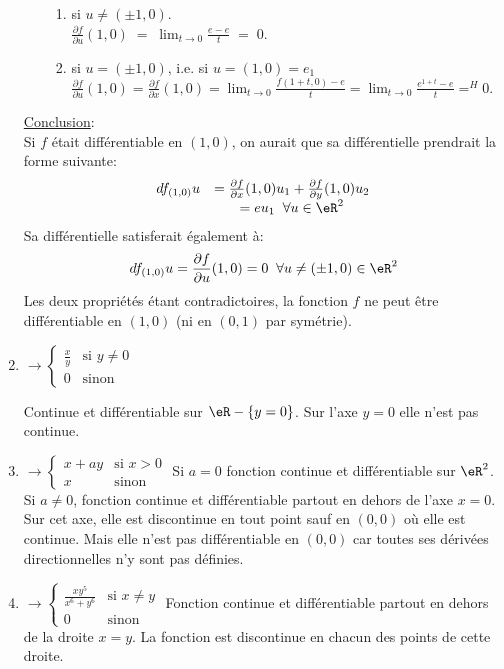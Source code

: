 \begin{enumerate}
\begin{enumerate}
\begin{enumerate}
\item si $u\neq(\pm1,0)$.\\
    $\frac{ \partial f }{ \partial u }(1,0) \;=\;\lim_{t\rightarrow 0}\frac{e-e}{t}\;=\;0$.
\item si $u=(\pm1,0)$, i.e. si $u=(1,0) = e_1$\\
    $\frac{ \partial f }{ \partial u }(1,0) = \frac{ \partial f }{ \partial x }(1,0)=\lim_{t\rightarrow 0}\frac{f(1+t,0)-e}{t}=\lim_{t\rightarrow 0}\frac{e^{1+t}-e}{t} =^H0$.
\end{enumerate}
\end{enumerate}
\underline{Conclusion}:\\
Si $f$ était différentiable en $(1,0)$, on aurait que sa différentielle prendrait la forme suivante:
\[\begin{array}{cc} df_{(1,0)}u& = \frac{ \partial f }{ \partial x }(1,0)u_1+\frac{ \partial f }{ \partial y }(1,0)u_2\\
    & = eu_1\;\;\forall u\in\eR^2 \end{array} \]
Sa différentielle satisferait également à:
\[  df_{(1,0)}u = \frac{ \partial f }{ \partial u }(1,0) = 0 \;\; \forall u \neq (\pm1,0) \in \eR^2\]
Les deux propriétés étant contradictoires, la fonction $f$ ne peut être différentiable en $(1,0)$ (ni en $(0,1)$ par symétrie).

\item \( \rightarrow  \begin{cases}
        \frac{ x }{ y }    &   \text{si } y\neq 0\\
        0    &    \text{sinon}
    \end{cases}\)

Continue et différentiable sur $\eR-\{y=0\}$. Sur l'axe $y=0$ elle n'est pas continue.
\item \( \rightarrow  \begin{cases}
        x+ay    &   \text{si } x>0\\
        x    &    \text{sinon}
    \end{cases}\)
Si $a=0$ fonction continue et différentiable sur $\eR^2$. Si $a\neq0$, fonction continue et différentiable partout en dehors de l'axe $x=0$. Sur cet axe, elle est discontinue en tout point sauf en $(0,0)$ où elle est continue. Mais elle n'est pas différentiable en $(0,0)$ car toutes ses dérivées directionnelles  n'y sont pas définies.
\item \(  \rightarrow\begin{cases}
        \frac{ xy^5 }{ x^6+y^6 }    &   \text{si } x\neq y\\
        0    &    \text{sinon}
    \end{cases}\)
Fonction continue et différentiable partout en dehors de la droite $x=y$.  La fonction est discontinue en chacun des points de cette droite.

\end{enumerate}

